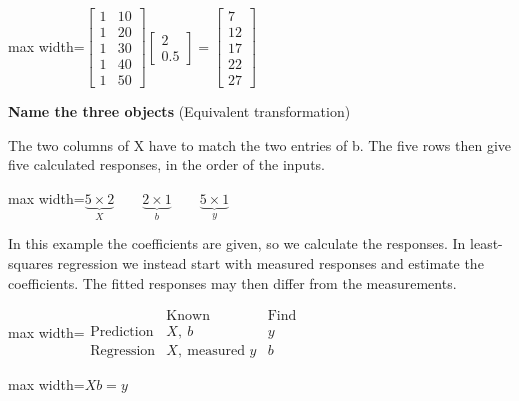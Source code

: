\documentclass[11pt,a4paper]{article}
\begin{document}
\begin{center}\begin{adjustbox}{max width=\linewidth}$\displaystyle \begin{bmatrix}1&10\\1&20\\1&30\\1&40\\1&50\end{bmatrix}\begin{bmatrix}2\\0.5\end{bmatrix}=\begin{bmatrix}7\\12\\17\\22\\27\end{bmatrix}$\end{adjustbox}\end{center}
\noindent\textbf{Name the three objects} (Equivalent transformation)\par
The two columns of X have to match the two entries of b. The five rows then give five calculated responses, in the order of the inputs.
\begin{center}\begin{adjustbox}{max width=\linewidth}$\displaystyle \underbrace{5\times 2}_{X}\qquad\underbrace{2\times 1}_{b}\qquad\underbrace{5\times 1}_{y}$\end{adjustbox}\end{center}

In this example the coefficients are given, so we calculate the responses. In least-squares regression we instead start with measured responses and estimate the coefficients. The fitted responses may then differ from the measurements.
\begin{center}\begin{adjustbox}{max width=\linewidth}$\displaystyle \begin{array}{lcc} & \text{Known} & \text{Find}\\\text{Prediction} & X,\ b & y\\\text{Regression} & X,\ \text{measured }y & b\end{array}$\end{adjustbox}\end{center}


\begin{center}\begin{adjustbox}{max width=\linewidth}$\displaystyle Xb=y$\end{adjustbox}\end{center}
\end{document}
